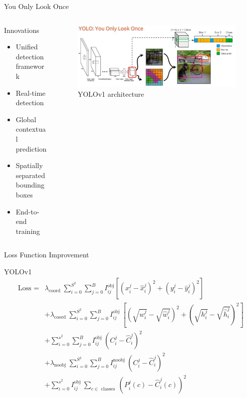 \begin{frame}{You Only Look Once}
	\begin{columns}
		\begin{column}{0.43\textwidth}
			\begin{block}{Innovations}
				\begin{itemize}
				\item Unified detection framework
				\item Real-time detection
				\item Global contextual prediction
				\item Spatially separated bounding boxes
				\item End-to-end training
			\end{itemize}
			\end{block}
		\end{column}
		\begin{column}{0.57\textwidth}
			\begin{figure}[h]
				\centering
				\includegraphics[width=\textwidth]{images/yolov1.png}
				\caption{YOLOv1 architecture}
				\label{fig:yolov1}
			\end{figure}
		\end{column}
	\end{columns}
\end{frame}

\begin{frame}{Loss Function Improvement}
	\begin{block}{YOLOv1}
		\begin{equation}
			\begin{aligned}
				\text { Loss }= & \lambda_{\text {coord }} \sum_{i=0}^{S^2} \sum_{j=0}^B I_{i j}^{\mathrm{obj}}\left[\left(x_i^j-\hat{x}_i^j\right)^2+\left(y_i^j-\hat{y}_i^j\right)^2\right] \\
				& +\lambda_{\text {coord }} \sum_{i=0}^{S^2} \sum_{j=0}^B I_{i j}^{\text {obj }}\left[\left(\sqrt{w_i^j}-\sqrt{\hat{w}_i^j}\right)^2+\left(\sqrt{h_i^j}-\sqrt{\hat{h}_i^j}\right)^2\right] \\
				& +\sum_{i=0}^{s^2} \sum_{j=0}^B I_{i j}^{\text {obj }}\left(C_i^j-\hat{C}_i^j\right)^2 \\
				& +\lambda_{\text {noobj }} \sum_{i=0}^{S^2} \sum_{j=0}^B I_{i j}^{\text {noobj }}\left(C_i^j-\hat{C}_i^j\right)^2 \\
				& +\sum_{i=0}^{s^2} I_{i j}^{\text {obj }} \sum_{c \in \text { classes }}\left(P_i^j(c)-\hat{C}_i^j(c)\right)^2
			\end{aligned}
		\end{equation}
	\end{block}
\end{frame}


